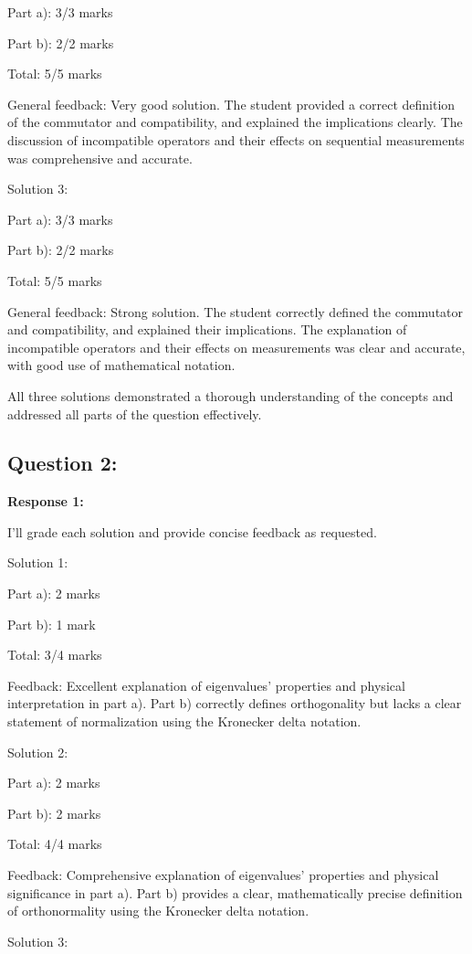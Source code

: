 \documentclass[a4paper,11pt]{article}
\begin{document}
Part a): 3/3 marks

Part b): 2/2 marks

Total: 5/5 marks

General feedback: Very good solution. The student provided a correct definition of the commutator and compatibility, and explained the implications clearly. The discussion of incompatible operators and their effects on sequential measurements was comprehensive and accurate.

Solution 3:

Part a): 3/3 marks

Part b): 2/2 marks

Total: 5/5 marks

General feedback: Strong solution. The student correctly defined the commutator and compatibility, and explained their implications. The explanation of incompatible operators and their effects on measurements was clear and accurate, with good use of mathematical notation.

All three solutions demonstrated a thorough understanding of the concepts and addressed all parts of the question effectively.

\subsection*{Question 2:}

\textbf{Response 1:}

I'll grade each solution and provide concise feedback as requested.

Solution 1:

Part a): 2 marks

Part b): 1 mark

Total: 3/4 marks

Feedback: Excellent explanation of eigenvalues' properties and physical interpretation in part a). Part b) correctly defines orthogonality but lacks a clear statement of normalization using the Kronecker delta notation.

Solution 2:

Part a): 2 marks

Part b): 2 marks

Total: 4/4 marks

Feedback: Comprehensive explanation of eigenvalues' properties and physical significance in part a). Part b) provides a clear, mathematically precise definition of orthonormality using the Kronecker delta notation.

Solution 3:
\end{document}
